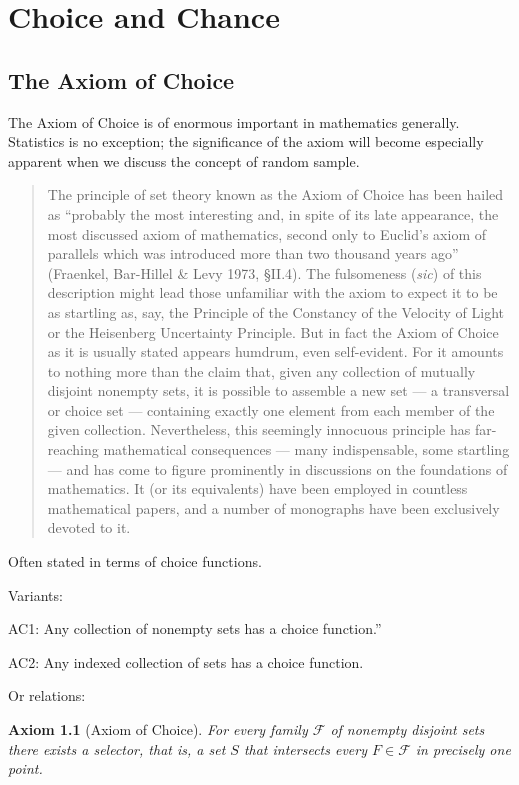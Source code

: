 \documentclass[reqno,12pt]{tufte-book}
\numberwithin{equation}{subsection}
\newtheorem{axiom}{Axiom}
\begin{document}
\chapter{Choice and Chance}

\section{The Axiom of Choice}

The Axiom of Choice is of enormous important in mathematics generally.
Statistics is no exception; the significance of the axiom will become
especially apparent when we discuss the concept of random sample.

\blockquote{The principle of set theory known as the Axiom of Choice has been hailed as “probably the most interesting and, in spite of its late appearance, the most discussed axiom of mathematics, second only to Euclid's axiom of parallels which was introduced more than two thousand years ago” (Fraenkel, Bar-Hillel \& Levy 1973, §II.4).  The fulsomeness (\textit{sic}) of this description might lead those unfamiliar with the axiom to expect it to be as startling as, say, the Principle of the Constancy of the Velocity of Light or the Heisenberg Uncertainty Principle. But in fact the Axiom of Choice as it is usually stated appears humdrum, even self-evident. For it amounts to nothing more than the claim that, given any collection of mutually disjoint nonempty sets, it is possible to assemble a new set — a transversal or choice set — containing exactly one element from each member of the given collection. Nevertheless, this seemingly innocuous principle has far-reaching mathematical consequences — many indispensable, some startling — and has come to figure prominently in discussions on the foundations of mathematics. It (or its equivalents) have been employed in countless mathematical papers, and a number of monographs have been exclusively devoted to it.\cite{bell_axiom_2013}}

Often stated in terms of choice functions.

Variants:

AC1: 
Any collection of nonempty sets has a choice function.''

AC2: 
Any indexed collection of sets has a choice function.

Or relations:

\begin{axiom}[Axiom of Choice]
\label{ax:choice}
For every family $\mathcal{F}$ of nonempty disjoint sets there exists
a \textit{selector}, that is, a set $S$ that intersects every $F\in
\mathcal{F}$ in precisely one point.\cite{ciesielski_set_1997}
\end{axiom}
\end{document}
